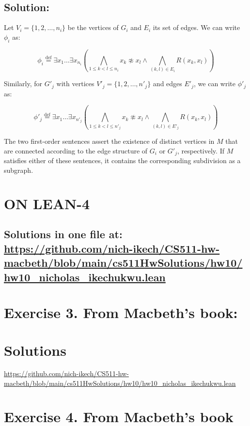 \documentclass{article}
\begin{document}
\subsection*{Solution:}

Let $V_i = \{1, 2, \ldots, n_i\}$ be the vertices of $G_i$ and $E_i$ its set of edges. We can write $\phi_i$ as:

\[
\phi_i \stackrel{\text{def}}{=} \exists x_1 \ldots \exists x_{n_i} \left(
    \bigwedge_{1 \leq k < l \leq n_i} x_k \not\approx x_l \land
    \bigwedge_{(k,l) \in E_i} R(x_k, x_l)
\right)
\]

Similarly, for $G'_j$ with vertices $V'_j = \{1, 2, \ldots, n'_j\}$ and edges $E'_j$, we can write $\phi'_j$ as:

\[
\phi'_j \stackrel{\text{def}}{=} \exists x_1 \ldots \exists x_{n'_j} \left(
    \bigwedge_{1 \leq k < l \leq n'_j} x_k \not\approx x_l \land
    \bigwedge_{(k,l) \in E'_j} R(x_k, x_l)
\right)
\]

The two first-order sentences assert the existence of distinct vertices in $M$ that are connected according to the edge structure of $G_i$ or $G'_j$, respectively. If $M$ satisfies either of these sentences, it contains the corresponding subdivision as a subgraph.




\section*{ON LEAN-4}
\subsection*{Solutions in one file at: 
\url{https://github.com/nich-ikech/CS511-hw-macbeth/blob/main/cs511HwSolutions/hw10/hw10_nicholas_ikechukwu.lean}}

\newpage

\section*{Exercise 3. From Macbeth’s book:}
\section*{Solutions}
\url{https://github.com/nich-ikech/CS511-hw-macbeth/blob/main/cs511HwSolutions/hw10/hw10_nicholas_ikechukwu.lean}

\newpage

\section*{Exercise 4. From Macbeth's book}
\end{document}
